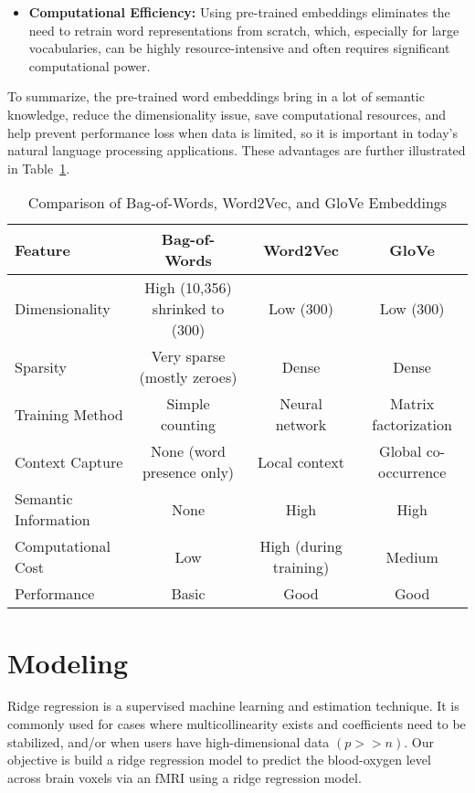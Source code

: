 \documentclass[12pt,letterpaper]{article}
\begin{document}
\begin{itemize}[itemsep=0.2cm]
    \item \textbf{Computational Efficiency:} Using pre-trained embeddings eliminates the need to retrain word representations from scratch, which, especially for large vocabularies, can be highly resource-intensive and often requires significant computational power.
\end{itemize}

To summarize, the pre-trained word embeddings bring in a lot of semantic knowledge, reduce the dimensionality issue, save computational resources, and help prevent performance loss when data is limited, so it is important in today's natural language processing applications. These advantages are further illustrated in Table~\ref{tab:embedding_comparison}.


\begin{table}[H]
\centering
\renewcommand{\arraystretch}{1.25}
{\fontsize{11}{12}\selectfont
\begin{tabular}{|l|c|c|c|}
\hline
\textbf{Feature} & \textbf{Bag-of-Words} & \textbf{Word2Vec} & \textbf{GloVe} \\
\hline
Dimensionality & High (10,356) shrinked to (300) & Low (300) & Low (300) \\
\hline
Sparsity & Very sparse (mostly zeroes) & Dense & Dense \\
\hline
Training Method & Simple counting & Neural network & Matrix factorization \\
\hline
Context Capture & None (word presence only) & Local context & Global co-occurrence \\
\hline
Semantic Information & None & High & High \\
\hline
Computational Cost & Low & High (during training) & Medium \\
\hline
Performance & Basic & Good & Good \\
\hline
\end{tabular}
}
\caption{Comparison of Bag-of-Words, Word2Vec, and GloVe Embeddings}
\label{tab:embedding_comparison}
\end{table}




\section{Modeling}

Ridge regression is a supervised machine learning and estimation technique. It is commonly used for cases where multicollinearity exists and coefficients need to be stabilized, and/or when users have high-dimensional data $(p>>n)$. Our objective is build a ridge regression model to predict the blood-oxygen level across brain voxels via an fMRI using a ridge regression model. 
\end{document}
